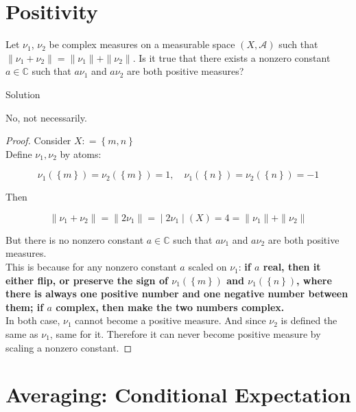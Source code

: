 \documentclass{qlnotes-export}
\begin{document}
\section{Positivity}\label{positivity}

Let \(\nu_{1}\), \(\nu_{2}\) be complex measures on a measurable space \((X,\mathcal{A})\) such that \(\parallel \nu_{1} + \nu_{2} \parallel = \parallel \nu_{1} \parallel + \parallel \nu_{2} \parallel\). Is it true that there exists a nonzero constant \(a \in {\mathbb{C}}\) such that \(a\nu_{1}\) and \(a\nu_{2}\) are both positive measures?

\begin{qlsolution}{Solution}

No, not necessarily.

\end{qlsolution}

\begin{proof}

Consider \(X: = \left\{ {m,n} \right\}\)\\
Define \(\nu_{1},\nu_{2}\) by atoms:

\[\nu_{1}(\left\{ m \right\}) = \nu_{2}(\left\{ m \right\}) = 1,\quad\nu_{1}(\left\{ n \right\}) = \nu_{2}(\left\{ n \right\}) = - 1\]

Then

\[\left. \parallel \nu_{1} + \nu_{2} \parallel = \parallel 2\nu_{1} \parallel = \middle| 2\nu_{1} \middle| (X) = 4 = \parallel \nu_{1} \parallel + \parallel \nu_{2} \parallel \right.\]

But there is no nonzero constant \(a \in {\mathbb{C}}\) such that \(a\nu_{1}\) and \(a\nu_{2}\) are both positive measures.\\
This is because for any nonzero constant \(a\) scaled on \(\nu_{1}\): \textbf{if \(a\) real, then it either flip, or preserve the sign of \(\nu_{1}(\left\{ m \right\})\) and \(\nu_{1}(\left\{ n \right\})\), where there is always one positive number and one negative number between them; if \(a\) complex, then make the two numbers complex.}\\
In both case, \(\nu_{1}\) cannot become a positive measure. And since \(\nu_{2}\) is defined the same as \(\nu_{1}\), same for it. Therefore it can never become positive measure by scaling a nonzero constant.

\end{proof}

\section{Averaging: Conditional Expectation}\label{averaging-conditional-expectation}
\end{document}
